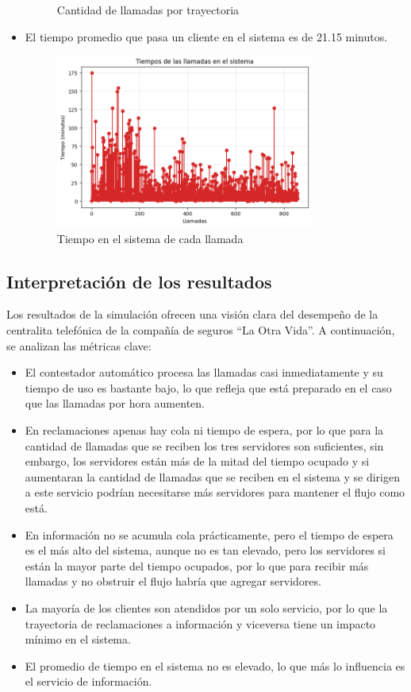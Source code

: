 \documentclass[12pt]{article}
\begin{document}
\begin{itemize}
\begin{figure}[H]
        \caption{Cantidad de llamadas por trayectoria}
        \label{fig: Cantidad de llamadas por trayectoria}
    \end{figure}
    \item El tiempo promedio que pasa un cliente en el sistema es de 21.15 minutos.
    \begin{figure}[H]
        \centering
        \includegraphics[width=0.8\textwidth]{time.png}
        \caption{Tiempo en el sistema de cada llamada}
        \label{fig: Tiempo en el sistema de cada llamada}
    \end{figure}
\end{itemize}

\subsection{Interpretación de los resultados}
Los resultados de la simulación ofrecen una visión clara del desempeño de la centralita telefónica de la compañía de seguros “La Otra Vida”. A continuación, se analizan las métricas clave:
\begin{itemize}
    \item El contestador automático procesa las llamadas casi inmediatamente y su tiempo de uso es bastante bajo, lo que refleja que está preparado en el caso que las llamadas por hora aumenten.
    \item En reclamaciones apenas hay cola ni tiempo de espera, por lo que para la cantidad de llamadas que se reciben los tres servidores son suficientes, sin embargo, los servidores están más de la mitad del tiempo ocupado y si aumentaran la cantidad de llamadas que se reciben en el sistema y se dirigen a este servicio podrían necesitarse más servidores para mantener el flujo como está.
    \item En información no se acumula cola prácticamente, pero el tiempo de espera es el más alto del sistema, aunque no es tan elevado, pero los servidores si están la mayor parte del tiempo ocupados, por lo que para recibir más llamadas y no obstruir el flujo habría que agregar servidores.
    \item La mayoría de los clientes son atendidos por un solo servicio, por lo que la trayectoria de reclamaciones a información y viceversa tiene un impacto mínimo en el sistema.
    \item El promedio de tiempo en el sistema no es elevado, lo que más lo influencia es el servicio de información.
\end{itemize}
\end{document}
